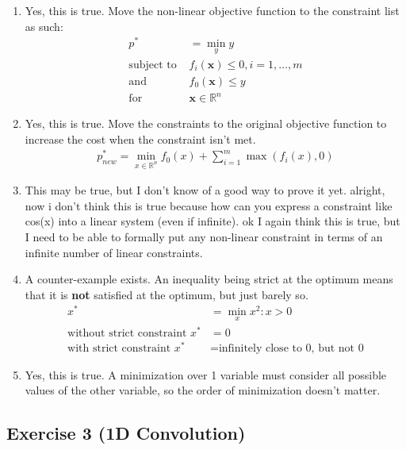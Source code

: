 \documentclass[11pt]{article}
\begin{document}
\begin{solution}
\begin{enumerate}
\item Yes, this is true. Move the non-linear objective function to the constraint list as such:
\begin{align*}
    p^* &= \min_{y} y \\
    \text{subject to } &f_i(\bm{x}) \leq 0, i = 1,\dots,m \\
    \text{and } &f_0(\bm{x}) \leq y \\
    \text{for } &\bm{x} \in \mathbb{R}^n
\end{align*}

\item Yes, this is true. Move the constraints to the original objective function to increase the cost when the constraint isn't met.
\begin{align*}
    p_{new}^* = \min_{x \in \mathbb{R}^n} f_0(x) + \sum_{i=1}^m \max(f_i(x),0)
\end{align*}

\item This may be true, but I don't know of a good way to prove it yet. alright, now i don't think this is true because how can you express a constraint like cos(x)  into a linear system (even if infinite). ok I again think this is true, but I need to be able to formally put any non-linear constraint in terms of an infinite number of linear constraints.

\item A counter-example exists. An inequality being strict at the optimum means that it is \textbf{not} satisfied at the optimum, but just barely so.
\begin{align*}
    x^* &= \min_{x} x^2 : x > 0 \\
    \text{without strict constraint } x^* &= 0 \\
    \text{with strict constraint } x^* &= \text{infinitely close to 0, but not 0}
\end{align*}

\item Yes, this is true. A minimization over 1 variable must consider all possible values of the other variable, so the order of minimization doesn't matter.
\end{enumerate}
\end{solution}

\newpage
\subsection*{Exercise 3 (1D Convolution)}
\end{document}
